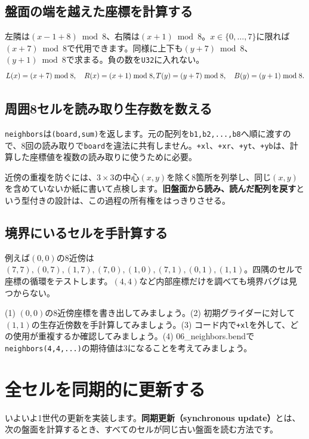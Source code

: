 \documentclass[11pt,a4paper,openany]{book}
\newcommand{\code}[1]{\texttt{#1}}
\newcommand{\file}[1]{\textsf{\color{blue}#1}}
\newcommand{\term}[1]{\textbf{#1}}
\newcommand{\readcode}[2]{}
\newcommand{\exercise}[1]{\begin{exercisebox}#1\end{exercisebox}}
\begin{document}
\section{盤面の端を越えた座標を計算する}
左隣は\((x-1+8)\bmod8\)、右隣は\((x+1)\bmod8\)。\(x\in\{0,\ldots,7\}\)に限れば\((x+7)\bmod8\)で代用できます。同様に上下も\((y+7)\bmod8\)、\((y+1)\bmod8\)で求まる。負の数を\code{U32}に入れない。
\[
L(x)=(x+7)\bmod8,\quad R(x)=(x+1)\bmod8,\\
T(y)=(y+7)\bmod8,\quad B(y)=(y+1)\bmod8.
\]
\section{周囲8セルを読み取り生存数を数える}
\readcode{06_neighbors.bend}{近傍数を足す（06\_neighbors.bend）}
\code{neighbors}は\code{(board,sum)}を返します。元の配列を\code{b1,b2,...,b8}へ順に渡すので、8回の読み取りで\code{board}を違法に共有しません。\code{+xl}、\code{+xr}、\code{+yt}、\code{+yb}は、計算した座標値を複数の読み取りに使うために必要。

\begin{pointbox}
近傍の重複を防ぐには、\(3\times3\)の中心\((x,y)\)を除く8箇所を列挙し、同じ\((x,y)\)を含めていないか紙に書いて点検します。\textbf{旧盤面から読み、読んだ配列を戻す}という型付きの設計は、この過程の所有権をはっきりさせる。
\end{pointbox}

\section{境界にいるセルを手計算する}
例えば\((0,0)\)の8近傍は\((7,7),(0,7),(1,7),(7,0),(1,0),(7,1),(0,1),(1,1)\)。四隅のセルで座標の循環をテストします。\((4,4)\)など内部座標だけを調べても境界バグは見つからない。

\exercise{(1) \((0,0)\)の8近傍座標を書き出してみましょう。(2) 初期グライダーに対して\((1,1)\)の生存近傍数を手計算してみましょう。(3) コード内で\code{+xl}を外して、どの使用が重複するか確認してみましょう。(4) \file{06\_neighbors.bend}で\code{neighbors(4,4,...)}の期待値は3になることを考えてみましょう。}

\chapter{全セルを同期的に更新する}
\begin{tcolorbox}[colback=blue!3,colframe=blue!16,boxrule=.35pt,arc=1mm,left=3mm,right=3mm,top=2mm,bottom=2mm]
\small いよいよ1世代の更新を実装します。\term{同期更新（synchronous update）}とは、次の盤面を計算するとき、すべてのセルが同じ古い盤面を読む方法です。
\end{tcolorbox}
\end{document}
